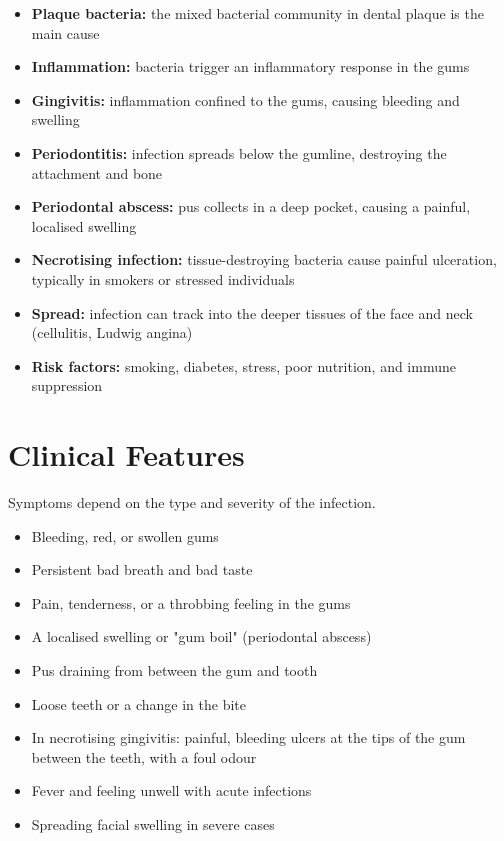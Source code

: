 \begin{itemize}
    \item \textbf{Plaque bacteria:} the mixed bacterial community in dental plaque is the main cause
    \item \textbf{Inflammation:} bacteria trigger an inflammatory response in the gums
    \item \textbf{Gingivitis:} inflammation confined to the gums, causing bleeding and swelling
    \item \textbf{Periodontitis:} infection spreads below the gumline, destroying the attachment and bone
    \item \textbf{Periodontal abscess:} pus collects in a deep pocket, causing a painful, localised swelling
    \item \textbf{Necrotising infection:} tissue-destroying bacteria cause painful ulceration, typically in smokers or stressed individuals
    \item \textbf{Spread:} infection can track into the deeper tissues of the face and neck (cellulitis, Ludwig angina)
    \item \textbf{Risk factors:} smoking, diabetes, stress, poor nutrition, and immune suppression
\end{itemize}

\section*{Clinical Features}
Symptoms depend on the type and severity of the infection.

\begin{itemize}
    \item Bleeding, red, or swollen gums
    \item Persistent bad breath and bad taste
    \item Pain, tenderness, or a throbbing feeling in the gums
    \item A localised swelling or "gum boil" (periodontal abscess)
    \item Pus draining from between the gum and tooth
    \item Loose teeth or a change in the bite
    \item In necrotising gingivitis: painful, bleeding ulcers at the tips of the gum between the teeth, with a foul odour
    \item Fever and feeling unwell with acute infections
    \item Spreading facial swelling in severe cases
\end{itemize}

